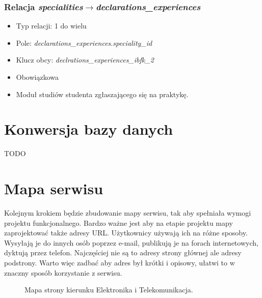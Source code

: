 \documentclass[a4paper,12pt,oneside]{report}
\begin{document}
\subsubsection{Relacja \emph{specialities}$\to$\emph{declarations\_experiences}}
\label{subsub:specialities-declarations_experiences}
\begin{itemize}
  \item Typ relacji: 1 do wielu
  \item Pole: \emph{declarations\_experiences}.\emph{speciality\_id}
  \item Klucz obcy: \emph{declrations\_experiences\_ibfk\_2}
  \item Obowiązkowa
  \item Moduł studiów studenta zgłaszającego się na praktykę.
\end{itemize}

\section{Konwersja bazy danych}
\label{sec:db-konwersja}
TODO

\section{Mapa serwisu}
\label{sec:mapa}
Kolejnym krokiem będzie zbudowanie mapy serwisu, tak aby spełniała wymogi projektu funkcjonalnego. Bardzo ważne jest aby na etapie projektu mapy zaprojektować także adresy URL. Użytkownicy używają ich na różne sposoby. Wysyłają je do innych osób poprzez e-mail, publikują je na forach internetowych, dyktują przez telefon. Najczęściej nie są to adresy strony głównej ale adresy podstrony. Warto więc zadbać aby adres był krótki i opisowy, ułatwi to w znaczny sposób korzystanie z serwisu.

\newpage
\thispagestyle{empty}
\addtolength{\textwidth}{4cm}
\addtolength{\hoffset}{-2.5cm}
\addtolength{\textheight}{5cm}
\addtolength{\voffset}{-3.5cm}
\begin{landscape}
\begin{figure}
\centering
  \caption{
  Mapa strony kierunku Elektronika i Telekomunikacja.
  \label{fig:eitmap}
  }
\end{figure}
\end{landscape}
\newpage
\addtolength{\textwidth}{-4cm}
\addtolength{\hoffset}{2.5cm}
\addtolength{\textheight}{-5cm}
\addtolength{\voffset}{3.5cm}
\end{document}

